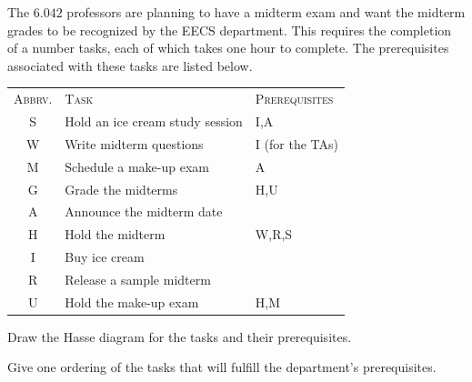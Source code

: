 \documentclass[12pt,twoside]{article}
\begin{document}
\begin{problem}{20}
The $6.042$ professors are planning to have a midterm exam and want the midterm grades to be recognized by the EECS department. This requires the completion of a number
tasks, each of which takes one hour to complete.  The prerequisites associated with these tasks are
listed below.
\begin{center}
\begin{tabular}{cll}
\textsc{Abbrv.} & \textsc{Task} & \textsc{Prerequisites} \\
S & Hold an ice cream study session & I,A\\
W & Write midterm questions &  I (for the TAs)\\
M & Schedule a make-up exam & A \\
G & Grade the midterms & H,U\\
A & Announce the midterm date &  \\
H & Hold the midterm & W,R,S \\
I & Buy ice cream &  \\
R & Release a sample midterm &  \\
U & Hold the make-up exam & H,M 
\end{tabular}
\end{center}

\bparts

 Draw the Hasse diagram for the tasks and their
prerequisites.
  

 Give one ordering of the tasks that will fulfill the department's prerequisites.


\end{problem}
\end{document}
